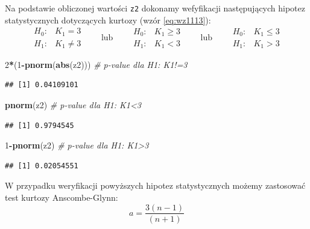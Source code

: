 \documentclass[polish,]{book}
\newenvironment{Shaded}{\begin{snugshade}}{\end{snugshade}}
\newcommand{\CommentTok}[1]{\textcolor[rgb]{0.56,0.35,0.01}{\textit{#1}}}
\newcommand{\DecValTok}[1]{\textcolor[rgb]{0.00,0.00,0.81}{#1}}
\newcommand{\KeywordTok}[1]{\textcolor[rgb]{0.13,0.29,0.53}{\textbf{#1}}}
\newcommand{\NormalTok}[1]{#1}
\newcommand{\OperatorTok}[1]{\textcolor[rgb]{0.81,0.36,0.00}{\textbf{#1}}}
\begin{document}
Na podstawie obliczonej wartości \texttt{z2} dokonamy wefyfikacji następujących hipotez
statystycznych dotyczących kurtozy (wzór \eqref{eq:wz1113}):
\[
\begin{array}{ll}
H_0: & K_1 = 3\\
H_1: & K_1 \neq 3
\end{array}
\qquad\text{lub}\qquad
\begin{array}{ll}
H_0: & K_1 \geq 3\\
H_1: & K_1 < 3
\end{array}
\qquad\text{lub}\qquad
\begin{array}{ll}
H_0: & K_1 \leq 3\\
H_1: & K_1 > 3
\end{array}
\]

\begin{Shaded}
\begin{Highlighting}[]
\DecValTok{2}\OperatorTok{*}\NormalTok{(}\DecValTok{1}\OperatorTok{-}\KeywordTok{pnorm}\NormalTok{(}\KeywordTok{abs}\NormalTok{(z2))) }\CommentTok{# p-value dla H1: K1!=3}
\end{Highlighting}
\end{Shaded}

\begin{verbatim}
## [1] 0.04109101
\end{verbatim}

\begin{Shaded}
\begin{Highlighting}[]
\KeywordTok{pnorm}\NormalTok{(z2)            }\CommentTok{# p-value dla H1: K1<3}
\end{Highlighting}
\end{Shaded}

\begin{verbatim}
## [1] 0.9794545
\end{verbatim}

\begin{Shaded}
\begin{Highlighting}[]
\DecValTok{1}\OperatorTok{-}\KeywordTok{pnorm}\NormalTok{(z2)          }\CommentTok{# p-value dla H1: K1>3}
\end{Highlighting}
\end{Shaded}

\begin{verbatim}
## [1] 0.02054551
\end{verbatim}

W przypadku weryfikacji powyższych hipotez statystycznych możemy zastosować
test kurtozy Anscombe-Glynn:
\begin{equation}
a=\frac{3(n-1)}{(n+1)}
\label{eq:wz1116}
\end{equation}
\end{document}
